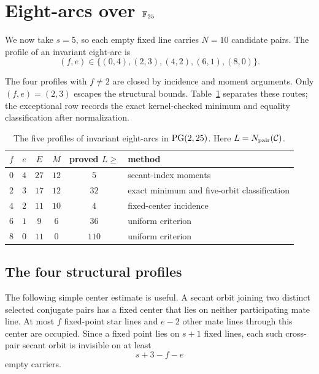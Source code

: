 \section{Eight-arcs over \texorpdfstring{$\mathbb{F}_{25}$}{F25}}\label{sec:q25}

We now take $s=5$, so each empty fixed line carries $N=10$ candidate
pairs.  The profile of an invariant eight-arc is
\[
 (f,e)\in\{(0,4),(2,3),(4,2),(6,1),(8,0)\}.
\]

The four profiles with $f\ne2$ are closed by incidence and moment arguments.
Only $(f,e)=(2,3)$ escapes the structural bounds.  Table~\ref{tab:q25-profiles}
separates these routes; the exceptional row records the exact
kernel-checked minimum and equality classification after normalization.

\begin{table}[ht]
\centering
\small
\begin{tabular}{ccccc l}
\toprule
$f$ & $e$ & $E$ & $M$ & proved $L\ge$ & method \\
\midrule
$0$ & $4$ & $27$ & $12$ & $5$   & secant-index moments \\
$2$ & $3$ & $17$ & $12$ & $32$  & exact minimum and five-orbit classification \\
$4$ & $2$ & $11$ & $10$ & $4$   & fixed-center incidence \\
$6$ & $1$ & $9$  & $6$  & $36$  & uniform criterion \\
$8$ & $0$ & $11$ & $0$  & $110$ & uniform criterion \\
\bottomrule
\end{tabular}
\caption{The five profiles of invariant eight-arcs in $\operatorname{PG}(2,25)$.
Here $L=N_{\mathrm{pair}}(\mathcal{C})$.}
\label{tab:q25-profiles}
\end{table}

\subsection*{The four structural profiles}

The following simple center estimate is useful.  A secant orbit joining
two distinct selected conjugate pairs has a fixed center that lies on
neither participating mate line.  At most $f$ fixed-point star lines and
$e-2$ other mate lines through this center are occupied.  Since a fixed
point lies on $s+1$ fixed lines, each such cross-pair secant orbit is
invisible on at least
\begin{equation}\label{eq:cross-invisible}
  s+3-f-e
\end{equation}
empty carriers.

